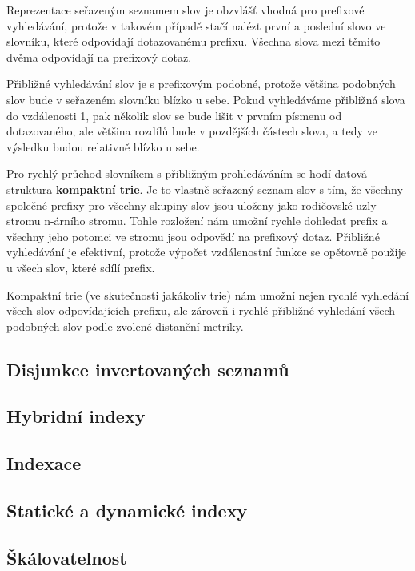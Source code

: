 \documentclass[11pt]{article}
\begin{document}
Reprezentace seřazeným seznamem slov je obzvlášť vhodná pro prefixové
vyhledávání, protože v takovém případě stačí nalézt první a poslední slovo ve
slovníku, které odpovídají dotazovanému prefixu. Všechna slova mezi těmito
dvěma odpovídají na prefixový dotaz.

Přibližné vyhledávání slov je s prefixovým podobné, protože většina podobných
slov bude v seřazeném slovníku blízko u sebe. Pokud vyhledáváme přibližná slova
do vzdálenosti 1, pak několik slov se bude lišit v prvním písmenu od
dotazovaného, ale většina rozdílů bude v pozdějších částech slova, a tedy ve
výsledku budou relativně blízko u sebe.

Pro rychlý průchod slovníkem s přibližným prohledáváním se hodí datová
struktura \textbf{kompaktní trie}. Je to vlastně seřazený seznam slov s tím, že
všechny společné prefixy pro všechny skupiny slov jsou uloženy jako rodičovské
uzly stromu n-árního stromu. Tohle rozložení nám umožní rychle dohledat prefix
a všechny jeho potomci ve stromu jsou odpovědí na prefixový dotaz. Přibližné
vyhledávání je efektivní, protože výpočet vzdálenostní funkce se opětovně
použije u všech slov, které sdílí prefix.

Kompaktní trie (ve skutečnosti jakákoliv trie) nám umožní nejen rychlé
vyhledání všech slov odpovídajících prefixu, ale zároveň i rychlé přibližné
vyhledání všech podobných slov podle zvolené distanční metriky.

\subsection{Disjunkce invertovaných seznamů}
\subsection{Hybridní indexy}
\subsection{Indexace}
\subsection{Statické a dynamické indexy}
\subsection{Škálovatelnost}
\end{document}
